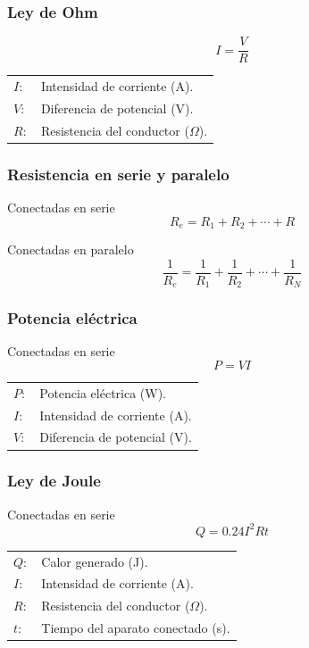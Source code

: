 \documentclass[handout]{beamer}
\begin{document}
\begin{frame}
  \frametitle{Ley de Ohm}
  
  {\huge \[I  = \frac{V}{R}\]}
  
  \begin{tabular}{ll}
    $I:$ & Intensidad de corriente (A).  \\ 
    $V:$ & Diferencia de potencial (V).  \\ 
    $R:$ & Resistencia del conductor ($\Omega$). \\ 
  \end{tabular}
  
\end{frame}


\begin{frame}
  \frametitle{Resistencia en serie y paralelo}
  \begin{block}{Conectadas en serie}
    {\huge \[R_e = R_1 + R_2 + \cdots +R\]}
  \end{block}

  \begin{block}{Conectadas en paralelo}
    {\huge \[\frac{1}{R_e} = \frac{1}{R_1}+\frac{1}{R_2}+ \cdots + \frac{1}{R_N}\]}
  \end{block}

\end{frame}



\begin{frame}
  \frametitle{Potencia eléctrica }
  \begin{block}{Conectadas en serie}
    {\huge \[P = VI\]}
  \end{block}

  \begin{tabular}{ll}
    $P:$ & Potencia eléctrica (W).  \\ 
    $I:$ & Intensidad de corriente (A).  \\
    $V:$ & Diferencia de potencial (V).  \\ 
  \end{tabular}

\end{frame}


\begin{frame}
  \frametitle{Ley de Joule}
  \begin{block}{Conectadas en serie}
    {\huge \[Q =  0.24I^2Rt\]}
  \end{block}

  \begin{tabular}{ll}
    $Q:$ & Calor generado (J).  \\ 
    $I:$ & Intensidad de corriente (A).  \\ 
    $R:$ & Resistencia del conductor ($\Omega$). \\ 
    $t:$ & Tiempo del aparato conectado (s). \\ 
  \end{tabular}

\end{frame}
\end{document}
